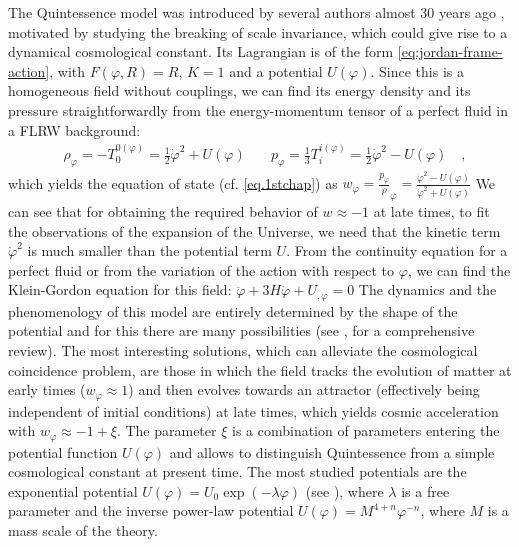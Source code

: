 The Quintessence model
was introduced by several authors almost 30 years
ago ,
motivated by studying the 
breaking of scale invariance, which could give rise to a dynamical cosmological constant.
Its Lagrangian is of the form \cref{eq:jordan-frame-action}, with
$F(\varphi, R) = R$, $K = 1$ and a potential $U(\varphi)$.
Since this is a homogeneous field without couplings, we can find its energy density and its pressure 
straightforwardly from the energy-momentum tensor of a perfect fluid in a FLRW background:
\begin{align}\label{eq:quintessence-rho-p}
&\rho_{\varphi} = -T^{0 (\varphi)}_0 = \frac{1}{2}\dot\varphi^2 + U(\varphi) \quad 
&p_{\varphi} = \frac{1}{3} T^{i (\varphi)}_i = \frac{1}{2}\dot\varphi^2 - U(\varphi) \quad ,
\end{align}
which yields the equation of state (cf. \cref{eq.1stchap}) as
\beeqp$
w_\varphi  = \frac{p_{\varphi}}\rho_{\varphi} = \frac{\dot\varphi^2 - U(\varphi)}{\dot\varphi^2 + U(\varphi)}
$
We can see that for obtaining the required behavior of $w\approx -1$ at late times, to fit 
the observations of the expansion of the Universe, we need that the kinetic term $\dot\varphi^2$
is much smaller than the potential term $U$.
From the continuity equation for a perfect fluid or from the variation of the action with respect to $\varphi$,
we can find the Klein-Gordon equation for this field:
\beeqp$
\label{eq:Klein-Gordon-Quintessence}
\ddot \varphi + 3 H \dot \varphi + U_{,\varphi} = 0
$
The dynamics and the phenomenology of this model are entirely determined by the shape of the potential
and for this there are many possibilities (see \cite[chap. 7]{amendola_dark_2010}, for a comprehensive review).
The most interesting solutions, which can alleviate the cosmological coincidence problem, are those in which the field
tracks the evolution of matter at early times ($w_\varphi \approx 1$) and then 
evolves towards an attractor (effectively being independent of initial conditions) 
at late times, which yields cosmic acceleration with $w_\varphi \approx -1+\xi$.
The parameter $\xi$ is a combination of parameters entering the potential function $U(\varphi)$ and allows
to distinguish Quintessence from a simple cosmological constant at present time.
The most studied potentials are the exponential potential $U(\varphi) = U_0\exp(-\lambda \varphi)$ 
(see \cite{cite copeland, wetterich}), where $\lambda$ is a free parameter
and the inverse power-law potential $U(\varphi) = M^{4+n} \varphi^{-n}$,
where $M$ is a mass scale of the theory.

